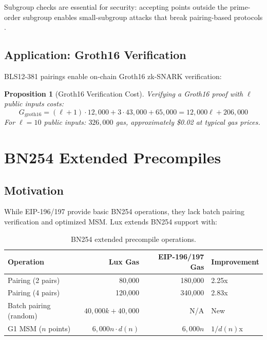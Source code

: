 \documentclass[11pt,a4paper]{article}
\newtheorem{proposition}[theorem]{Proposition}
\begin{document}
Subgroup checks are essential for security: accepting points outside the prime-order subgroup enables small-subgroup attacks that break pairing-based protocols \cite{barreto2006subgroup}.

\subsection{Application: Groth16 Verification}

BLS12-381 pairings enable on-chain Groth16 zk-SNARK verification:

\begin{proposition}[Groth16 Verification Cost]
Verifying a Groth16 proof with $\ell$ public inputs costs:
\begin{equation}
    G_{\text{groth16}} = (\ell + 1) \cdot 12{,}000 + 3 \cdot 43{,}000 + 65{,}000 = 12{,}000\ell + 206{,}000
\end{equation}
For $\ell = 10$ public inputs: $326{,}000$ gas, approximately \$0.02 at typical gas prices.
\end{proposition}

\section{BN254 Extended Precompiles}\label{sec:bn254}

\subsection{Motivation}

While EIP-196/197 provide basic BN254 operations, they lack batch pairing verification and optimized MSM. Lux extends BN254 support with:

\begin{table}[H]
\centering
\caption{BN254 extended precompile operations.}
\label{tab:bn254}
\begin{tabular}{lrrl}
\toprule
\textbf{Operation} & \textbf{Lux Gas} & \textbf{EIP-196/197 Gas} & \textbf{Improvement} \\
\midrule
Pairing (2 pairs) & 80,000 & 180,000 & 2.25x \\
Pairing (4 pairs) & 120,000 & 340,000 & 2.83x \\
Batch pairing (random) & $40{,}000k + 40{,}000$ & N/A & New \\
G1 MSM ($n$ points) & $6{,}000n \cdot d(n)$ & $6{,}000n$ & $1/d(n)$x \\
\bottomrule
\end{tabular}
\end{table}
\end{document}
